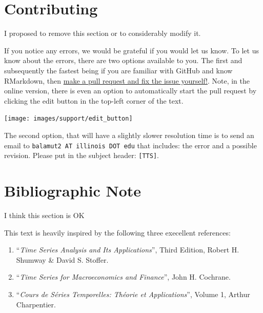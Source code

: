 \documentclass[]{book}
\providecommand{\tightlist}{%
  \setlength{\itemsep}{0pt}\setlength{\parskip}{0pt}}
\theoremstyle{definition}
\theoremstyle{definition}
\theoremstyle{definition}
\theoremstyle{remark}
\begin{document}
\hypertarget{contributing}{%
\section{Contributing}\label{contributing}}

\begin{rmdcomment}
I proposed to remove this section or to considerably modify it.
\end{rmdcomment}

If you notice any errors, we would be grateful if you would let us know.
To let us know about the errors, there are two options available to you.
The first and subsequently the fastest being if you are familiar with
GitHub and know RMarkdown, then
\href{https://github.com/SMAC-Group/TTS}{make a pull request and fix the
issue yourself!}. Note, in the online version, there is even an option
to automatically start the pull request by clicking the edit button in
the top-left corner of the text.

\begin{center}\texttt{[image: images/support/edit\_button]} \end{center}

The second option, that will have a slightly slower resolution time is
to send an email to \texttt{balamut2\ AT\ illinois\ DOT\ edu} that
includes: the error and a possible revision. Please put in the subject
header: \texttt{{[}TTS{]}}.

\hypertarget{bibliographic-note}{%
\section{Bibliographic Note}\label{bibliographic-note}}

\begin{rmdcomment}
I think this section is OK
\end{rmdcomment}

This text is heavily inspired by the following three execellent
references:

\begin{enumerate}
\def\labelenumi{\arabic{enumi}.}
\tightlist
\item
  ``\emph{Time Series Analysis and Its Applications}'', Third Edition,
  Robert H. Shumway \& David S. Stoffer.
\item
  ``\emph{Time Series for Macroeconomics and Finance}'', John H.
  Cochrane.
\item
  ``\emph{Cours de Séries Temporelles: Théorie et Applications}'',
  Volume 1, Arthur Charpentier.
\end{enumerate}
\end{document}
